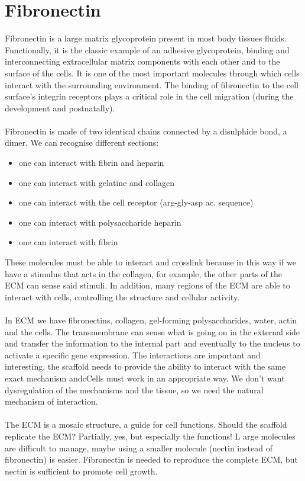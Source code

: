 \section{Fibronectin}
Fibronectin is a large matrix glycoprotein present in most body tissues fluids. 
Functionally, it is the classic example of an adhesive glycoprotein, binding and interconnecting extracellular matrix components with each other and to the surface of the cells. 
It is one of the most important molecules through which cells interact with the surrounding environment. 
The binding of fibronectin to the cell surface’s integrin receptors plays a critical role in the cell migration (during the development and postnatally).
\\
\\
\noindent
Fibronectin is made of two identical chains connected by a disulphide bond, a dimer. 
We can recognise different sections:
\begin{itemize}
\item one can interact with fibrin and heparin
\item one can interact with gelatine and collagen
\item one can interact with the cell receptor (arg-gly-asp ac. sequence)
\item one can interact with polysaccharide heparin
\item one can interact with fibrin
\end{itemize}
\noindent
These molecules must be able to interact and crosslink because in this way if we have a stimulus that acts in the collagen, for example, the other parts of the ECM can sense said stimuli. In addition, many regions of the ECM are able to interact with cells, controlling the structure and cellular activity.
\\
\\
\noindent
In ECM we have fibronectins, collagen, gel-forming polysaccharides, water, actin and the cells. 
The transmembrane can sense what is going on in the external side and transfer the information to the internal part and eventually to the nucleus to activate a specific gene expression. 
The interactions are important and interesting, the scaffold needs to provide the ability to interact with the same exact mechanism andcCells must work in an appropriate way. 
We don’t want dysregulation of the mechanisms and the tissue, so we need the natural mechanism of interaction.
\\
\\
\noindent
The ECM is a mosaic structure, a guide for cell functions. 
Should the scaffold replicate the ECM? Partially, yes, but especially the functions! L
arge molecules are difficult to manage, maybe using a smaller molecule (nectin instead of fibronectin) is easier. 
Fibronectin is needed to reproduce the complete ECM, but nectin is sufficient to promote cell growth.

